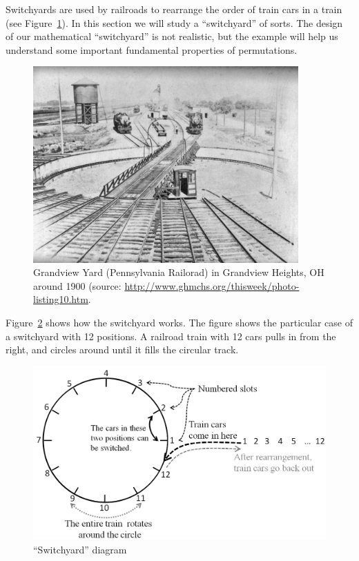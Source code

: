Switchyards are used by railroads to rearrange the order of train cars in a train (see Figure~\ref{fig:grandview}). In this section we will study a ``switchyard'' of sorts. The design of our mathematical ``switchyard'' is not realistic, but the example will help us understand some important fundamental properties of permutations.
\begin{figure}[ht]
\begin{center}
\includegraphics[width=4in]{images/GrandviewYard.jpg}
\caption{Grandview Yard (Pennsylvania Railorad) in Grandview Heights, OH around 1900 (source: \url{http://www.ghmchs.org/thisweek/photo-listing10.htm}. }\label{fig:grandview}
\end{center}
\end{figure}

Figure~\ref{fig:switchyard} shows how the switchyard works. The figure shows the particular case of a switchyard with 12 positions. A railroad train with 12 cars pulls in from the right, and circles around until it fills the circular track. 
\begin{figure}[ht]
\begin{center}
\includegraphics[width=4.5in]{images/switchyard.png}
\caption{``Switchyard'' diagram}\label{fig:switchyard}
\end{center}
\end{figure}

